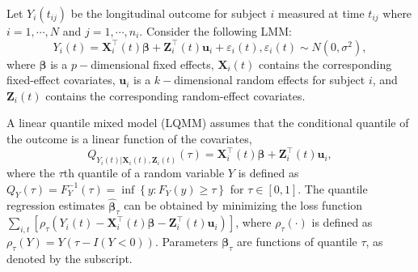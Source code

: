 

Let $Y_{i}(t_{ij})$ be the longitudinal outcome for subject $i$ measured at time $t_{ij}$ where $i=1, \cdots, N$ and  $j=1,\cdots, n_i$. Consider the following LMM:
\begin{equation}\label{eqn:bcklmm}
Y_{i}(t) ={\boldsymbol X}_{i}^{\top}(t) \boldsymbol{\beta}+ {\boldsymbol Z}_{i}^{\top}(t)\boldsymbol{u}_i + \varepsilon_{i}(t), \varepsilon_{i}(t)\sim N(0, \sigma^{2}),
\end{equation}
where $\boldsymbol{\beta}$ is a $p-$dimensional fixed effects,  ${\boldsymbol X}_{i}(t)$ contains the corresponding fixed-effect covariates, $\boldsymbol{u}_i$ is a $k-$dimensional random effects for subject $i$, and ${\boldsymbol Z}_{i}(t)$ contains the corresponding random-effect covariates.

A linear quantile mixed model (LQMM) assumes that the conditional quantile of the outcome is a linear function of the covariates,
\begin{equation}\label{eqn:bcklqmm}
Q_{Y_{i}(t)|{\boldsymbol X}_{i}(t),{\boldsymbol Z}_{i}(t)}(\tau)={\boldsymbol X}_{i}^{\top}(t) \boldsymbol{\beta}+ {\boldsymbol Z}_{i}^{\top}(t)\boldsymbol{u}_i,
\end{equation}
where the $\tau$th quantile of a random variable $Y$ is defined as $Q_{Y}(\tau)=F_{Y}^{-1}(\tau)=\inf\left\{ y:F_{Y}(y)\geq\tau\right\}$ for $\tau\in [0, 1]$. The quantile regression estimates $\hat{\boldsymbol{\beta}}_{\tau}$ can be obtained by minimizing the loss function $\sum_{i, t}\left[\rho_{\tau}\left(Y_{i}(t)-{\boldsymbol X}_{i}^{\top}(t)\boldsymbol{\beta} - {\boldsymbol Z}_{i}^{\top}(t)\boldsymbol{u}_i\right)\right]$, where $\rho_{\tau}(\cdot)$ is defined as $\rho_{\tau}(Y)=Y(\tau-{I}{(Y<0)})$. Parameters $\boldsymbol{\beta}_{\tau}$ are functions of quantile $\tau$, as denoted by the subscript.

